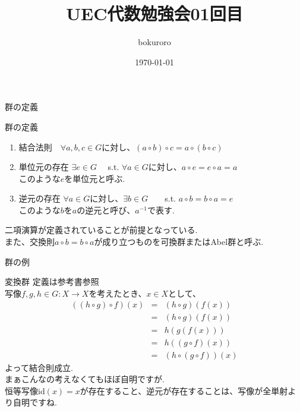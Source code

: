 \documentclass[dvipdfmx,11pt,notheorems]{beamer}
\title{UEC代数勉強会01回目}
\author{bokuroro}
\date{\today}
\begin{document}
\maketitle
\begin{frame}{群の定義}
  \begin{block}{群の定義}
  \begin{enumerate}
   \item 結合法則　$\forall a,b,c \in G$に対し、$(a\circ b)\circ c=a\circ(b\circ c)$
   \item 単位元の存在 $\exists e \in G$　 s.t.  $\forall a \in G$に対し、$a\circ e=e\circ a=a$\\
   このような$e$を\alert{単位元}と呼ぶ.
   \item 逆元の存在 $\forall a \in G$に対し、$\exists b \in G$　　s.t.  $a\circ b = b\circ a=e$\\
   このような$b$を$a$の\alert{逆元}と呼び、$a^{-1}$で表す.
  \end{enumerate}
\end{block}
  \alert{二項演算}が定義されていることが前提となっている.\\
  また、交換則$a\circ b=b\circ a$が成り立つものを\alert{可換群}または\alert{Abel群}と呼ぶ.
\end{frame}
\begin{frame}{群の例}
  \begin{exampleblock}{変換群}
    定義は参考書参照\\
    写像$f,g,h \in G: X \rightarrow X$を考えたとき、$x \in X$として、
    \begin{eqnarray*}
      ((h\circ g)\circ f)(x) &=& (h\circ g)(f(x))\\
      &=&(h\circ g)(f(x))\\
      &=&h(g(f(x)))\\
      &=& h((g\circ f)(x))\\
      &=& (h\circ (g\circ f))(x)
    \end{eqnarray*}
    よって結合則成立. \\
    まぁこんなの考えなくてもほぼ自明ですが. \\
    恒等写像$\mathrm{id}(x)=x$が存在すること、逆元が存在することは、写像が全単射より自明ですね.
  \end{exampleblock}
\end{frame}
\end{document}
